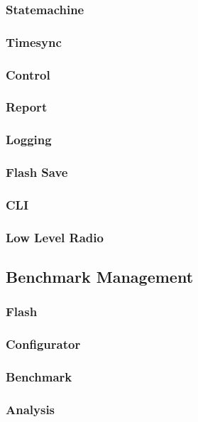 \subsubsection{Statemachine}\label{subsubsec:Statemachine}

\subsubsection{Timesync}\label{subsubsec:Timesync}

\subsubsection{Control}\label{subsubsec:Control}

\subsubsection{Report}\label{subsubsec:Report}

\subsubsection{Logging}\label{subsubsec:Logging}

\subsubsection{Flash Save}\label{subsubsec:FlashSave}

\subsubsection{CLI}\label{subsubsec:CLI}

\subsubsection{Low Level Radio}\label{subsubsec:LowLevelRadio}



\subsection{Benchmark Management}\label{subsec:Benchmark Management}

\subsubsection{Flash}\label{subsubsec:Flash}

\subsubsection{Configurator}\label{subsubsec:Configurator}

\subsubsection{Benchmark}\label{subsubsec:Benchmark}

\subsubsection{Analysis}\label{subsubsec:Analysis}

